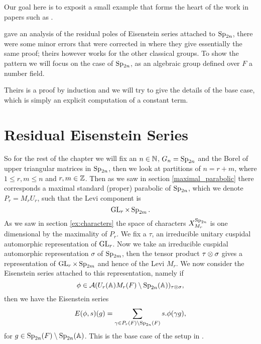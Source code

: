 \label{ch:jiang}
Our goal here is to exposit a small example that forms the heart of the work in papers such as \cite{brennerNotesAnalyticProperties2009}\cite{jiangPolesCertainResidual2013}. 

\cite{brennerNotesAnalyticProperties2009} gave an analysis of the residual poles of Eisenstein series attached to \(\operatorname{Sp}_{2n}\), there were some minor errors that were corrected in \cite{jiangPolesCertainResidual2013} where they give essentially the same proof; theirs however works for the other classical groups. To show the pattern we will focus on the case of \(\operatorname{Sp}_{2n}\), as an algebraic group defined over \(F\) a number field. 

Theirs is a proof by induction and we will try to give the details of the base case, which is simply an explicit computation of a constant term.

\section{Residual Eisenstein Series}
So for the rest of the chapter we will fix an \(n\in \N\), \(G_n = \operatorname{Sp}_{2n}\) and the Borel of upper triangular matrices in \(\operatorname{Sp}_{2n} \), then we look at partitions of \(n = r + m\), where \(1\leq r,m \leq n\) and \(r,m\in \Z\). Then as we saw in section \ref{maximal_parabolic} there corresponds a maximal standard (proper) parabolic of \(\operatorname{Sp}_{2n}\), which we denote \(P_r = M_rU_r\), such that the Levi component is 
\[\operatorname{GL}_r\times \operatorname{Sp}_{2m}. \]
As we saw in section \ref{ex:characters} the space of characters \(X^{\operatorname{Sp}_{2n}}_{M_r}\) is one dimensional by the maximality of \(P_r\). We fix a \(\tau\), an irreducible unitary cuspidal automorphic representation of \(\operatorname{GL}_r\). Now we take an irreducible cuspidal automorphic representation \(\sigma\) of \(\operatorname{Sp}_{2m}\), then the tensor product \(\tau \otimes \sigma\) gives a representation of \(\operatorname{GL}_{r}\times \operatorname{Sp}_{2m}\) and hence of the Levi \(M_r\). We now consider the Eisenstein series attached to this representation, namely if 
\[\phi\in \mathcal{A}(U_r(\A)M_r(F)\setminus \Sp_{2n}(\A) )_{\tau\tensor \sigma},\] 
then we have the Eisenstein series
\[E(\phi, s)(g) = \sum_{\gamma\in P_r(F) \setminus \Sp_{2n}(F)} s.\phi(\gamma g),\]
for \(g\in \Sp_{2n}(F) \setminus \Sp_{2n}(\A)\). 
This is the base case of the setup in \cite{jiangPolesCertainResidual2013}.

